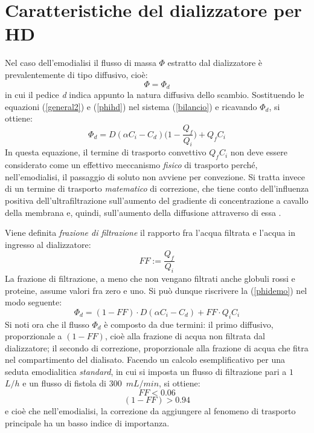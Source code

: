 \section{Caratteristiche del dializzatore per HD}
Nel caso dell'emodialisi il flusso di massa $\Phi$ estratto dal dializzatore è prevalentemente di tipo diffusivo, cioè:
\begin{equation}\label{phihd}
	\Phi=\Phi_d
\end{equation}
in cui il pedice \textit{d} indica appunto la natura diffusiva dello scambio. Sostituendo le equazioni (\ref{general2}) e (\ref{phihd}) nel sistema (\ref{bilancio}) e ricavando $\Phi_d$, si ottiene:
\begin{equation}\label{phidemo}
	\Phi_d = D (\alpha C_i - C_d)\biggl(1-\frac{Q_f}{Q_i}\biggr) + Q_f C_i
\end{equation}
In questa equazione, il termine di trasporto convettivo $Q_f C_i$ non deve essere considerato come un effettivo meccanismo \textit{fisico} di trasporto perché, nell'emodialisi, il passaggio di soluto non avviene per convezione. Si tratta invece di un termine di trasporto \textit{matematico} di correzione, che tiene conto dell'influenza positiva dell'ultrafiltrazione sull'aumento del gradiente di concentrazione a cavallo della membrana e, quindi, sull'aumento della diffusione attraverso di essa \cite{sargent}.

Viene definita \textit{frazione di filtrazione} il rapporto fra l'acqua filtrata e l'acqua in ingresso al dializzatore:
$$FF := \frac{Q_f}{Q_i}$$
La frazione di filtrazione, a meno che non vengano filtrati anche globuli rossi e proteine, assume valori fra zero e uno. Si può dunque riscrivere la (\ref{phidemo}) nel modo seguente:
\begin{equation}\label{phidFF}
	\Phi_d = (1-FF)\cdot D(\alpha C_i - C_d) + FF\cdot Q_i C_i
\end{equation}
Si noti ora che il flusso $\Phi_d$ è composto da due termini: il primo diffusivo, proporzionale a $(1-FF)$, cioè alla frazione di acqua non filtrata dal dializzatore; il secondo di correzione, proporzionale alla frazione di acqua che fitra nel compartimento del dialisato.
Facendo un calcolo esemplificativo per una seduta emodialitica \textit{standard}, in cui si imposta un flusso di filtrazione pari a $1$~$L/h$ e un flusso di fistola di $300$~$mL/min$, si ottiene:
$$ FF < 0.06 $$
$$ (1-FF) > 0.94 $$
e cioè che nell'emodialisi, la correzione da aggiungere al fenomeno di trasporto principale ha un basso indice di importanza.

